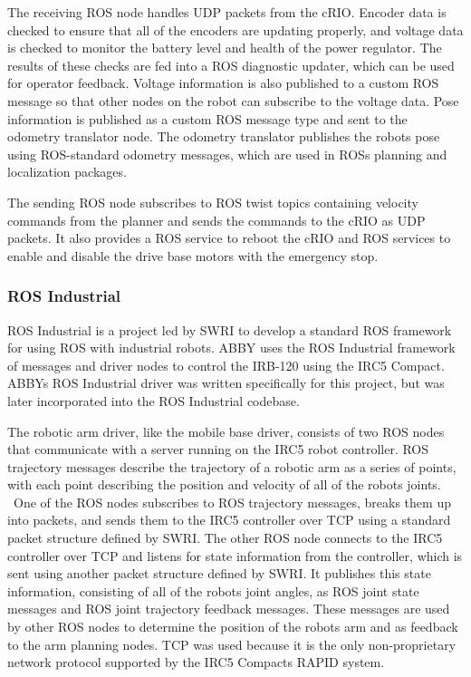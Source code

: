 \documentclass{cwru}
\begin{document}
The receiving ROS node handles UDP packets from the cRIO. Encoder data is checked to ensure that all of the encoders are updating properly, and voltage data is checked to monitor the battery level and health of the power regulator. The results of these checks are fed into a ROS diagnostic updater, which can be used for operator feedback. Voltage information is also published to a custom ROS message so that other nodes on the robot can subscribe to the voltage data. Pose information is published as a custom ROS message type and sent to the odometry translator node. The odometry translator publishes the robot{\textquotesingle}s pose using ROS-standard odometry messages, which are used in ROS{\textquotesingle}s planning and localization packages.

The sending ROS node subscribes to ROS {\textquotedbl}twist{\textquotedbl} topics containing velocity commands from the planner and sends the commands to the cRIO as UDP packets. It also provides a ROS service to reboot the cRIO and ROS services to enable and disable the drive base motors with the emergency stop.

\subsubsection{ROS Industrial}
ROS Industrial is a project led by SWRI to develop a standard ROS framework for using ROS with industrial robots.\cite{ros-industrial} ABBY uses the ROS Industrial framework of messages and driver nodes to control the IRB-120 using the IRC5 Compact. ABBY{\textquotesingle}s ROS Industrial driver was written specifically for this project, but was later incorporated into the ROS Industrial codebase.

The robotic arm driver, like the mobile base driver, consists of two ROS nodes that communicate with a server running on the IRC5 robot controller. ROS trajectory messages describe the trajectory of a robotic arm as a series of points, with each point describing the position and velocity of all of the robot{\textquotesingle}s joints. \ One of the ROS nodes subscribes to ROS trajectory messages, breaks them up into packets, and sends them to the IRC5 controller over TCP using a standard packet structure defined by SWRI. The other ROS node connects to the IRC5 controller over TCP and listens for state information from the controller, which is sent using another packet structure defined by SWRI. It publishes this state information, consisting of all of the robot{\textquotesingle}s joint angles, as ROS joint state messages and ROS joint trajectory feedback messages. These messages are used by other ROS nodes to determine the position of the robot{\textquotesingle}s arm and as feedback to the arm planning nodes. TCP was used because it is the only non-proprietary network protocol supported by the IRC5 Compact{\textquotesingle}s RAPID system.
\end{document}
